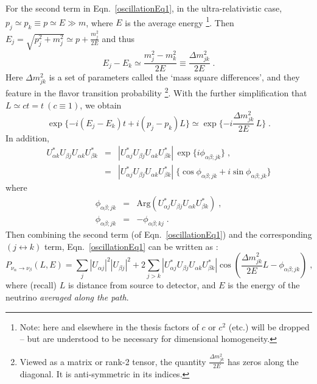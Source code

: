 For the second term in Eqn.~\ref{oscillationEq1}, in the ultra-relativistic case, $p_j\simeq p_k\equiv p\simeq E\gg m$, where $E$ is the average energy \footnote{Note: here and elsewhere in the thesis factors of $c$ or $c^2$ (etc.) will be dropped -- but are understood to be necessary for dimensional homogeneity.}. Then $E_j=\sqrt{p^2_j+m^2_j}\simeq p+\frac{m_j^2}{2E}$ and thus \cite{pdg2020,aitchison2012gauge}
\begin{equation}
E_j-E_k\simeq \frac{m^2_j-m^2_k}{2E}\equiv \frac{\Delta m^2_{jk}}{2E} \; .
\end{equation}
Here $\Delta m^2_{jk}$ is a set of parameters called the `mass square differences', and they feature in the flavor transition probability \footnote{Viewed as a matrix or rank-2 tensor, the quantity $\frac{\Delta m^2_{jk}}{2E}$ has zeros along the diagonal. It is anti-symmetric in its indices.}. With the further simplification that $L\simeq ct=t~(c\equiv 1)$, we obtain
\begin{equation*}
\exp\{-i(E_j-E_k)t+i(p_j-p_k)L\}\simeq \exp\{-i\frac{\Delta m^2_{jk}}{2E} \, L\} \; .
\end{equation*}
In addition,
\begin{eqnarray*}
U^*_{\alpha k}U_{\beta j}U_{\alpha k}U^*_{\beta k} &=& |U^*_{\alpha j}U_{\beta j}U_{\alpha k}U^*_{\beta k}| \, \exp\{i\phi_{\alpha\beta;jk}\} \; ,\\
&=& |U^*_{\alpha j}U_{\beta j}U_{\alpha k}U^*_{\beta k}| \; \{ \cos \phi_{\alpha\beta;jk} + i \sin \phi_{\alpha\beta;jk}\}
\end{eqnarray*}
where 
\begin{eqnarray*}
\phi_{\alpha\beta;jk} &=& \mathrm{Arg}(U^*_{\alpha j}U_{\beta j}U_{\alpha k}U^*_{\beta k}) \; , \\
\phi_{\alpha\beta;jk} &=& -\phi_{\alpha\beta;kj} \; .
\end{eqnarray*}
Then combining the second term (of Eqn.~\ref{oscillationEq1}) and the corresponding $(j\leftrightarrow k)$ term, Eqn.~\ref{oscillationEq1} can be written as \cite{aitchison2012gauge}:
\begin{equation}\label{oscillationEq2}
P_{\nu_\alpha\to\nu_\beta}(L,E)=
\sum_j |U_{\alpha j}|^2|U_{\beta j}|^2 + 2\sum_{j>k}|U^*_{\alpha j}U_{\beta j}U_{\alpha k}U^*_{\beta k}|\cos(\frac{\Delta m^2_{jk}}{2E}L-\phi_{\alpha\beta;jk}) \; ,
\end{equation}
where (recall) $L$ is distance from source to detector, and $E$ is the energy of the neutrino {\em averaged along the path}.


